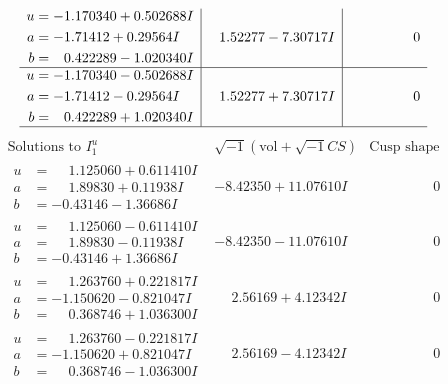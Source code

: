 \documentclass[1p]{elsarticle_modified}
\theoremstyle{definition}
\newcommand{\I}{\sqrt{-1}}
\begin{document}
$$\begin{array}{c|c|c}
\begin{aligned}
u &= -1.170340 + 0.502688 I \\
a &= -1.71412 + 0.29564 I \\
b &= \phantom{-}0.422289 - 1.020340 I\end{aligned}
 & \phantom{-}1.52277 - 7.30717 I & \phantom{-0.000000 } 0 \\ \hline\begin{aligned}
u &= -1.170340 - 0.502688 I \\
a &= -1.71412 - 0.29564 I \\
b &= \phantom{-}0.422289 + 1.020340 I\end{aligned}
 & \phantom{-}1.52277 + 7.30717 I & \phantom{-0.000000 } 0\\
 \hline 
 \end{array}$$\newpage$$\begin{array}{c|c|c}  
\text{Solutions to }I^u_{1}& \I (\text{vol} + \sqrt{-1}CS) & \text{Cusp shape}\\
 \hline 
\begin{aligned}
u &= \phantom{-}1.125060 + 0.611410 I \\
a &= \phantom{-}1.89830 + 0.11938 I \\
b &= -0.43146 - 1.36686 I\end{aligned}
 & -8.42350 + 11.07610 I & \phantom{-0.000000 } 0 \\ \hline\begin{aligned}
u &= \phantom{-}1.125060 - 0.611410 I \\
a &= \phantom{-}1.89830 - 0.11938 I \\
b &= -0.43146 + 1.36686 I\end{aligned}
 & -8.42350 - 11.07610 I & \phantom{-0.000000 } 0 \\ \hline\begin{aligned}
u &= \phantom{-}1.263760 + 0.221817 I \\
a &= -1.150620 - 0.821047 I \\
b &= \phantom{-}0.368746 + 1.036300 I\end{aligned}
 & \phantom{-}2.56169 + 4.12342 I & \phantom{-0.000000 } 0 \\ \hline\begin{aligned}
u &= \phantom{-}1.263760 - 0.221817 I \\
a &= -1.150620 + 0.821047 I \\
b &= \phantom{-}0.368746 - 1.036300 I\end{aligned}
 & \phantom{-}2.56169 - 4.12342 I & \phantom{-0.000000 } 0 \\ \hline\begin{aligned}

\end{aligned}
\end{array}$$
\end{document}
